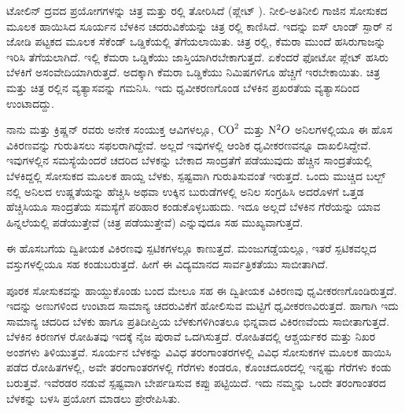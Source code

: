 ಟೋಲಿನ್ ದ್ರವದ ಪ್ರಯೋಗಗಳನ್ನು ಚಿತ್ರ  ಮತ್ತು ರಲ್ಲಿ ತೋರಿಸಿದೆ (ಪ್ಲೇಟ್ ). ನೀಲಿ-ಅತಿನೀಲಿ ಗಾಜಿನ ಸೋಸುಕದ ಮೂಲಕ ಹಾಯಿಸಿದ ಸೂರ್ಯನ ಬೆಳಕಿನ ಚದರುವಿಕೆಯನ್ನು ಚಿತ್ರ ರಲ್ಲಿ ಕಾಣಿಸಿದೆ. ಇದನ್ನು ಐಸ್ ಲಾಂಡ್ ಸ್ಪಾರ್ ನ ಜೋಡಿ ಪಟ್ಟಕದ ಮೂಲಕ  ಸೆಕೆಂಡ್ ಒಡ್ಡಿಕೆಯಲ್ಲಿ ತೆಗೆಯಲಾಯಿತು. ಚಿತ್ರ ರಲ್ಲಿ, ಕೆಮರಾ ಮುಂದೆ ಹಸಿರುಗಾಜನ್ನು ಇರಿಸಿ ತೆಗೆಯಲಾಗಿದೆ. ಇಲ್ಲಿ ಕೆಮರಾ ಒಡ್ಡಿಕೆಯು ಜಾಸ್ತಿಯಾಗಿರಬೇಕಾಗುತ್ತದೆ. ಏಕೆಂದರೆ ಫೋಟೋ ಪ್ಲೇಟ್ ಹಸಿರು ಬೆಳಕಿಗೆ ಅಸಂವೇದಿಯಾಗಿರುತ್ತದೆ. ಅದಕ್ಕಾಗಿ ಕೆಮರಾ ಒಡ್ಡಿಕೆಯು  ನಿಮಿಷಗಳಿಗೂ ಹೆಚ್ಚಿಗೆ ಇರಬೇಕಾಯಿತು. ಚಿತ್ರ  ಮತ್ತು ಚಿತ್ರ ರಲ್ಲಿನ ವ್ಯತ್ಯಾಸವನ್ನು ಗಮನಿಸಿ. ಇದು ಧೃವೀಕರಣಗೊಂಡ ಬೆಳಕಿನ ಪ್ರಖರತೆಯ ವ್ಯತ್ಯಾಸದಿಂದ ಉಂಟಾದದ್ದು.

ನಾನು ಮತ್ತು ಕ್ರಿಷ್ಣನ್ ರವರು ಅನೇಕ ಸಂಯುಕ್ತ ಆವಿಗಳಲ್ಲೂ, ${\rm CO}^2$ ಮತ್ತು ${\rm N}^2O$ ಅನಿಲಗಳಲ್ಲಿಯೂ ಈ ಹೊಸ ವಿಕಿರಣವನ್ನು ಗುರುತಿಸಲು ಸಫಲರಾಗಿದ್ದೇವೆ. ಅಲ್ಲದೆ ಇವುಗಳಲ್ಲಿ ಆಂಶಿಕ ಧೃವೀಕರಣವನ್ನೂ ದಾಖಲಿಸಿದ್ದೇವೆ. ಇವುಗಳಲ್ಲಿನ ಸಮಸ್ಯೆಯೆಂದರೆ ಚದರಿದ ಬೆಳಕನ್ನು ಬೇಕಾದ ಸಾಂದ್ರತೆಗೆ ಪಡೆಯುವುದು ಹೆಚ್ಚಿನ ಸಾಂದ್ರತೆಯಲ್ಲಿ ಬೆಳಕಿದ್ದಲ್ಲಿ ಸೋಸುಕದ ಮೂಲಕ ಹಾಯ್ದ ಬೆಳಕು, ಸ್ಪಷ್ಟವಾಗಿ ಗುರುತಿಸುವಂತೆ ಇರುತ್ತದೆ. ಒಂದು ಮುಚ್ಚಿದ ಬಲ್ಬ್ ನಲ್ಲಿ ಅನಿಲದ ಉಷ್ಣತೆಯನ್ನು ಹೆಚ್ಚಿಸಿ ಅಥವಾ ಉಕ್ಕಿನ ಬುರುಡೆಗಳಲ್ಲಿ ಅನಿಲ ಸಂಗ್ರಹಿಸಿ ಅದರೊಳಗೆ ಒತ್ತಡ ಹೆಚ್ಚಿಸಿಯೂ ಸಾಂದ್ರತೆಯ ಸಮಸ್ಯೆಗೆ ಪರಿಹಾರ ಕಂಡುಕೊಳ್ಳಬಹುದು. ಇದೂ ಅಲ್ಲದೆ ಬೆಳಕಿನ ಗೆರೆಯನ್ನು ಯಾವ ಹಿನ್ನಲೆಯಲ್ಲಿ ಪಡೆಯುತ್ತೇವೆ (ಚಿತ್ರ ಪಡೆಯುತ್ತೇವೆ) ಎನ್ನುವುದೂ ಸಹ ಮುಖ್ಯವಾಗುತ್ತದೆ.

ಈ ಹೊಸಬಗೆಯ ದ್ವಿತೀಯಕ ವಿಕಿರಣವು ಸ್ಪಟಿಕಗಳಲ್ಲೂ ಕಾಣುತ್ತದೆ. ಮಂಜುಗಡ್ಡೆಯಲ್ಲೂ, ಇತರೆ ಸ್ಪಟಿಕವಲ್ಲದ ವಸ್ತುಗಳಲ್ಲಿಯೂ ಸಹ ಕಂಡುಬರುತ್ತದೆ. ಹೀಗೆ ಈ ವಿದ್ಯಮಾನದ ಸಾರ್ವತ್ರಿಕತೆಯು ಸಾಬೀತಾಗಿದೆ.



ಪೂರಕ ಸೋಸುಕವನ್ನು ಹಾಯ್ದುಕೊಂಡು ಬಂದ ಮೇಲೂ ಸಹ ಈ ದ್ವಿತೀಯಕ ವಿಕಿರಣವು ಧೃವೀಕರಣಗೊಂಡಿರುತ್ತದೆ. ಇದನ್ನು ಅಣುಗಳಿಂದ ಉಂಟಾದ ಸಾಮಾನ್ಯ ಚದರುವಿಕೆಗೆ ಹೋಲಿಸುವ ಮಟ್ಟಿಗೆ ಧೃವೀಕರಣವಿರುತ್ತದೆ. ಹಾಗಾಗಿ ಇದು ಸಾಮಾನ್ಯ ಚದರಿದ ಬೆಳಕು ಹಾಗೂ ಪ್ರತಿದೀಪ್ತಿಯ ಬೆಳಕುಗಳಿಗಿಂತಲೂ ಭಿನ್ನವಾದ ವಿಕಿರಣವೆಂದು ಸಾಬೀತಾಗುತ್ತದೆ. ಬೆಳಕಿನ ಕಿರಣಗಳ ರೋಹಿತವು ಇದಕ್ಕೆ ನೈಜ ಪುರಾವೆ ಒದಗಿಸುತ್ತದೆ. ರೋಹಿತದಲ್ಲಿ ಆಶ್ಚರ್ಯಕರ ಮತ್ತು ನಿಖರ ಅಂಶಗಳು ತಿಳಿಯುತ್ತವೆ. ಸೂರ್ಯನ ಬೆಳಕನ್ನು ವಿವಿಧ ತರಂಗಾಂತರಗಳಲ್ಲಿ ವಿವಿಧ ಸೋಸುಕಗಳ ಮೂಲಕ ಹಾಯಿಸಿ ಪಡೆದ ರೋಹಿತಗಳಲ್ಲಿ, ಅವೇ ತರಂಗಾಂತರಗಳಲ್ಲಿ ಗೆರೆಗಳು ಕಂಡರೂ, ಕೊಂಚದೂರದಲ್ಲಿ ಇನ್ನಷ್ಟು ಗೆರೆಗಳು ಕಂಡು ಬರುತ್ತವೆ. ಇವೆರಡರ ನಡುವೆ ಸ್ಪಷ್ಟವಾಗಿ ಬೇರ್ಪಡಿಸುವ ಕಪ್ಪು ಪಟ್ಟಿಯಿದೆ. ಇದು ನಮ್ಮನ್ನು ಒಂದೇ ತರಂಗಾಂತರದ ಬೆಳಕನ್ನು ಬಳಸಿ ಪ್ರಯೋಗ ಮಾಡಲು ಪ್ರೇರೇಪಿಸಿತು.

